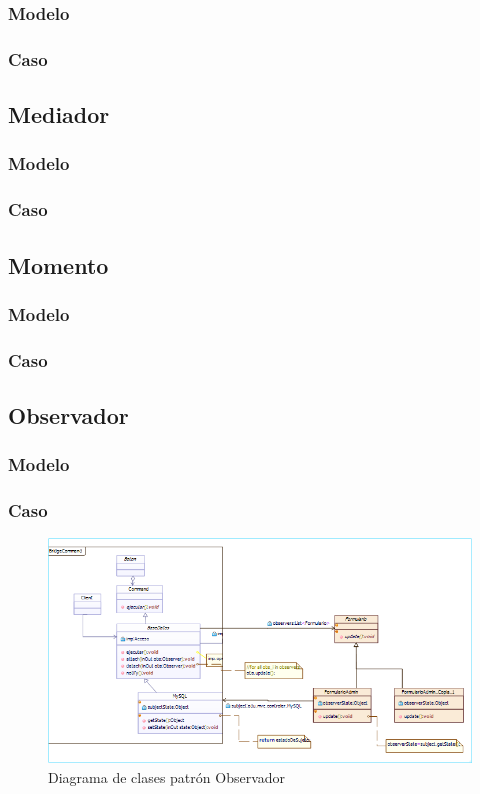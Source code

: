 \subsubsection{Modelo}
\newpage
\subsubsection{Caso}
\newpage

\subsection{Mediador}
\subsubsection{Modelo}
\newpage
\subsubsection{Caso}
\newpage

\subsection{Momento}
\subsubsection{Modelo}
\newpage
\subsubsection{Caso}
\newpage

\subsection{Observador}
\subsubsection{Modelo}
\newpage
\subsubsection{Caso}
	\begin{figure}[h!]
	\centering
	\includegraphics[width=1.0\linewidth]{arquitectura/imagenes/DiagramaObservador}
	\caption{Diagrama de clases patrón Observador}
\end{figure}



